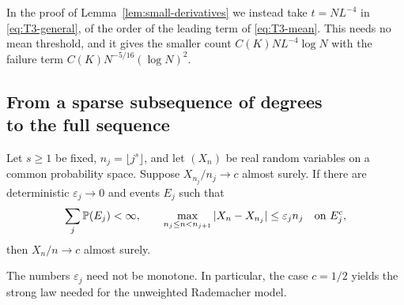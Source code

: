 In the proof of Lemma~\ref{lem:small-derivatives} we instead take
$t=NL^{-4}$ in \eqref{eq:T3-general}, of the order of the leading term of
\eqref{eq:T3-mean}. This needs no mean threshold, and it gives the
smaller count $C(K)NL^{-4}\log N$ with the failure term
$C(K)N^{-5/16}(\log N)^2$.

\subsection[From a sparse subsequence of degrees to the full sequence]{From a sparse subsequence of degrees\\to the full sequence}

\begin{theorem}\label{thm:T5}
Let $s\geq1$ be fixed, $n_j=\lfloor j^s\rfloor$, and let $(X_n)$
be real random variables on a common probability space.  Suppose
$X_{n_j}/n_j\to c$ almost surely.  If there are deterministic
$\varepsilon_j\to0$ and events
$E_j$ such that
\[
 \sum_j\mathbb P(E_j)<\infty,\qquad
 \max_{n_j\leq n<n_{j+1}}|X_n-X_{n_j}|
       \leq\varepsilon_j n_j\quad\hbox{on }E_j^c,
\]
then $X_n/n\to c$ almost surely.
\end{theorem}
The numbers $\varepsilon_j$ need not be monotone.
In particular, the case $c=1/2$ yields the strong law needed for the
unweighted Rademacher model.

